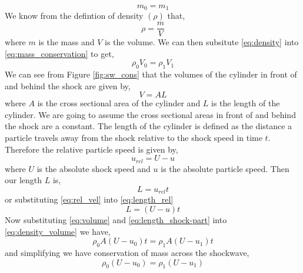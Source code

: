 \begin{equation} \label{eq:mass_conservation}
m_0 = m_1
\end{equation}
We know from the defintion of density $(\rho)$ that,
\begin{equation} \label{eq:density}
\rho = \frac{m}{V}
\end{equation}
where $m$ is the mass and $V$ is the volume.  We can then subsitute \ref{eq:density} into \ref{eq:mass_conservation} to get,
\begin{equation} \label{eq:density_volume}
\rho_0V_0 = \rho_1V_1
\end{equation}
We can see from Figure \ref{fig:sw_cons} that the volumes of the cylinder in front of and behind the shock are given by,
\begin{equation} \label{eq:volume}
V = AL
\end{equation}
where $A$ is the cross sectional area of the cylinder and $L$ is the length of the cylinder.  We are going to assume the cross sectional areas in front of and behind the shock are a constant.  The length of the cylinder is defined as the distance a particle travels away from the shock relative to the shock speed in time $t$.  Therefore the relative particle speed is given by,
\begin{equation} \label{eq:rel_vel}
u_{rel} = U - u
\end{equation}
where $U$ is the absolute shock speed and $u$ is the absolute particle speed.  Then our length $L$ is,
\begin{equation} \label{eq:length_rel}
L = u_{rel}t
\end{equation}
or substituting \ref{eq:rel_vel} into \ref{eq:length_rel}
\begin{equation} \label{eq:length_shock-part}
L = \left(U-u \right)t
\end{equation}
Now substituting \ref{eq:volume} and \ref{eq:length_shock-part} into \ref{eq:density_volume} we have,
\begin{equation} \label{eq:mass_in_out}
\rho_0A\left(U-u_0 \right)t = \rho_1A\left(U-u_1 \right)t
\end{equation}
and simplifying we have conservation of mass across the shockwave,
\begin{equation} \label{eq:conservation_of_mass}
\rho_0\left(U-u_0 \right) = \rho_1\left(U-u_1 \right)
\end{equation}

